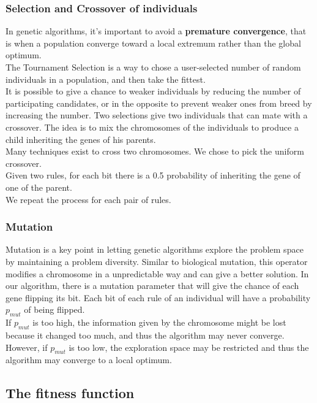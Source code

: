 \documentclass[a4paper,12pt]{article}
\begin{document}
\subsubsection{Selection and Crossover of individuals}

In genetic algorithms, it's important to avoid a \textbf{premature convergence}, that is when a population converge toward a local extremum rather than the global optimum. \\
The Tournament Selection is a way to chose a user-selected number of random individuals in a population, and then take the fittest.\\
It is possible to give a chance to weaker individuals by reducing the number of participating candidates, or in the opposite to prevent weaker ones from breed by increasing the number.
Two selections give two individuals that can mate with a crossover.
The idea is to mix the chromosomes of the individuals to produce a child inheriting the genes of his parents.\\
Many techniques exist to cross two chromosomes. We chose to pick the uniform crossover.\\
Given two rules, for each bit there is a 0.5 probability of inheriting the gene of one of the parent.\\
We repeat the process for each pair of rules.

\subsubsection{Mutation}

Mutation is a key point in letting genetic algorithms explore the problem space by maintaining a problem diversity. Similar to biological mutation, this operator modifies a chromosome in a unpredictable way and can give a better solution.
In our algorithm, there is a mutation parameter that will give the chance of each gene flipping its bit. Each bit of each rule of an individual will have a probability $p_{mut}$ of being flipped.\\
If $p_{mut}$ is too high, the information given by the chromosome might be lost because it changed too much, and thus the algorithm may never converge. However, if $p_{mut}$ is too low, the exploration space may be restricted and thus the algorithm may converge to a local optimum.


\subsection{The fitness function}
\end{document}
